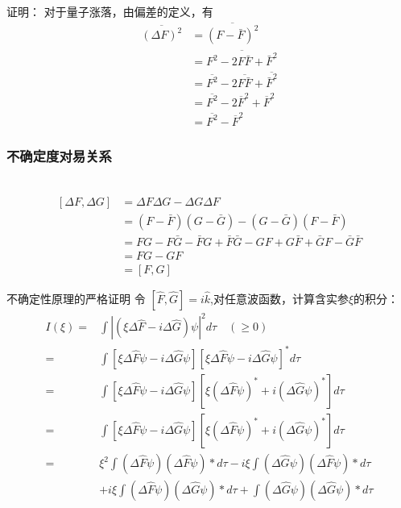 \begin{frame} 
    \frametitle{}
    \alert{证明：} 对于量子涨落，由偏差的定义，有
    \begin{equation*}
        \begin{split} 
        \overline{(\Delta F)^2}&= \overline{(F-\bar{F})^2}\\
        &=\overline{F^2-2F\bar{F}+\bar{F}^2 }\\
        &=\overline{F^2} -2\overline{F\bar{F}} +\overline{\bar{F}^2 }\\
        &=\overline{F^2} -2\overline{F}^2 +\overline{F}^2\\
        &= \overline{F^2} - \overline{F}^2
        \end{split}  
    \end{equation*} 
\end{frame} 

\begin{frame} 
    \frametitle{不确定度对易关系}
    \证~
    \begin{equation*}
        \begin{split} 
        [\Delta F, \Delta G]&= \Delta F \Delta G - \Delta G \Delta F \\
        &=(F-\bar{F}) (G-\bar{G})- (G-\bar{G}) (F-\bar{F}) \\
        &=FG -F\bar{G}-\bar{F}G + \bar{F} \bar{G} -GF + G \bar{F} + \bar{G} F -\bar{G} \bar{F}   \\
        &=FG-GF \\
        &=[F, G]
        \end{split}  
    \end{equation*} 
\end{frame} 

\begin{frame} {不确定性原理的严格证明}
    令 $[\hat{F}, \hat{G}]= i\hat{k}$,对任意波函数，计算含实参$\xi$的积分：
    $$
    \begin{aligned}
    I(\xi)= &\int|(\xi\Delta \hat{F}-i \Delta \hat{G}) \psi|^{2} d \tau \quad (\geq 0) \\
    =&\int[\xi \Delta \hat{F} \psi-i \Delta \hat{G} \psi][\xi \Delta \hat{F} \psi-i \Delta \hat{G} \psi]^{*} d \tau \\
    =&\int[\xi \Delta \hat{F} \psi-i \Delta \hat{G} \psi] [\xi(\Delta \hat{F} \psi)^{*}+i(\Delta \hat{G} \psi)^{*}] d \tau \\
    =&\int[\xi \Delta \hat{F} \psi-i \Delta \hat{G} \psi]\left[\xi(\Delta \hat{F} \psi)^{*}+i(\Delta \hat{G} \psi)^{*}\right] d \tau \\
    =& \xi^{2} \int(\Delta \hat{F} \psi)(\Delta \hat{F} \psi) * d \tau-i \xi \int(\Delta \hat{G} \psi)(\Delta \hat{F} \psi) * d \tau \\
        &+i \xi \int(\Delta \hat{F} \psi)(\Delta \hat{G} \psi) * d \tau+\int(\Delta \hat{G} \psi)(\Delta \hat{G} \psi) * d \tau \\
    \end{aligned}
    $$
\end{frame} 

